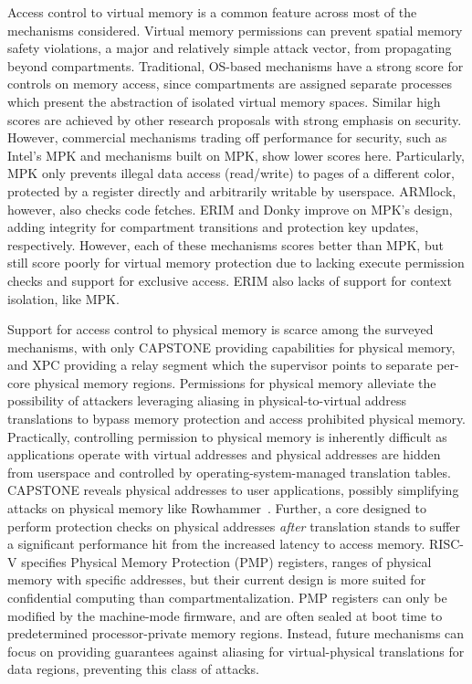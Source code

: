 Access control to virtual memory is a common feature across most of the
mechanisms considered.
Virtual memory permissions can prevent spatial memory safety violations,
a major and relatively simple attack vector, from propagating
beyond compartments.
Traditional, OS-based mechanisms have a strong score for controls on 
memory access, since compartments are assigned separate processes which present
the abstraction of isolated virtual memory spaces.
Similar high scores are achieved by other research proposals with strong
emphasis on security. 
However, commercial mechanisms trading off performance for security, such as
Intel's MPK and mechanisms built on MPK, show lower scores here.
Particularly, MPK only prevents illegal data access (read/write) to pages
of a different color, protected by a register directly and arbitrarily
writable by userspace.
ARMlock, however, also checks code fetches.
ERIM and Donky improve on MPK's design, adding integrity for compartment
transitions and protection key updates, respectively. 
However, each of these mechanisms scores better than MPK, but still score 
poorly for virtual memory protection due to lacking execute permission
checks and support for exclusive access.
ERIM also lacks of support for context isolation, like MPK.

Support for access control to physical memory is scarce among the surveyed
mechanisms, with only CAPSTONE providing capabilities for physical memory, and
XPC providing a relay segment which the supervisor points to separate per-core
physical memory regions.
Permissions for physical memory alleviate the possibility of attackers leveraging
aliasing in physical-to-virtual address translations to bypass memory protection
and access prohibited physical memory.
Practically, controlling permission to physical memory is inherently difficult
as applications operate with virtual addresses and physical addresses are hidden
from userspace and controlled by operating-system-managed translation tables.
CAPSTONE reveals physical addresses to user applications, possibly simplifying 
attacks on physical memory like Rowhammer~\cite{mutlu2019rowhammer}.
Further, a core designed to perform protection checks on physical addresses 
\emph{after} translation stands to suffer a significant performance hit from
the increased latency to access memory.
RISC-V specifies Physical Memory Protection (PMP) registers, ranges of physical 
memory with specific addresses, but their current design is more suited for
confidential computing than compartmentalization.
PMP registers can only be modified by the machine-mode firmware, and are often
sealed at boot time to predetermined processor-private memory regions.
Instead, future mechanisms can focus on providing guarantees against aliasing
for virtual-physical translations for data regions, preventing this class of
attacks.

